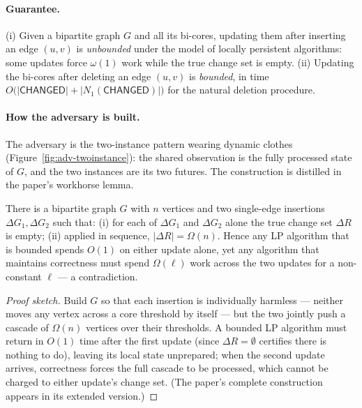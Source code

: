 
\paragraph{Guarantee.}

\begin{theorem}
\label{thm:adv-bicore}
(i) Given a bipartite graph $G$ and all its bi-cores, updating them after inserting an edge
$(u,v)$ is \emph{unbounded} under the model of locally persistent algorithms: some updates
force $\omega(1)$ work while the true change set is empty.
(ii) Updating the bi-cores after deleting an edge $(u,v)$ is \emph{bounded}, in time
$O\bigl(|\textsf{CHANGED}| + |N_1(\textsf{CHANGED})|\bigr)$ for the natural deletion procedure.
\eop
\end{theorem}

\paragraph{How the adversary is built.}
The adversary is the two-instance pattern wearing dynamic clothes
(Figure~\ref{fig:adv-twoinstance}): the shared observation is the fully processed state of
$G$, and the two instances are its two futures. The construction is distilled in the paper's
workhorse lemma.

\begin{lemma}
\label{lem:adv-twowupdates}
There is a bipartite graph $G$ with $n$ vertices and two single-edge insertions
$\Delta G_1, \Delta G_2$ such that: (i) for each of $\Delta G_1$ and $\Delta G_2$ alone the true
change set $\Delta R$ is empty; (ii) applied in sequence, $|\Delta R| = \Omega(n)$. Hence any
LP algorithm that is bounded spends $O(1)$ on either update alone, yet any algorithm that
maintains correctness must spend $\Omega(\ell)$ work across the two updates for a non-constant
$\ell$ --- a contradiction. \eop
\end{lemma}

\begin{proof}[Proof sketch]
Build $G$ so that each insertion is individually harmless --- neither moves any vertex across
a core threshold by itself --- but the two jointly push a cascade of $\Omega(n)$ vertices over
their thresholds. A bounded LP algorithm must return in $O(1)$ time after the first update
(since $\Delta R = \emptyset$ certifies there is nothing to do), leaving its local state
unprepared; when the second update arrives, correctness forces the full cascade to be
processed, which cannot be charged to either update's change set. (The paper's complete
construction appears in its extended version.)
\end{proof}

